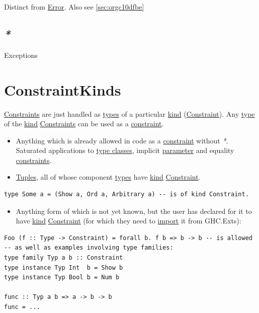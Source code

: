 \documentclass[a4paper,14pt,oneside]{book}
\begin{document}
Distinct from \hyperref[orgd80e896]{Error}. Also see \ref{sec:orgc10dfbe}

\section{\emph{*}}
\label{sec:org4d16655}

\label{orgca1b952}Exceptions

\chapter{\label{orgb2b7e99}ConstraintKinds}
\label{sec:org1b0f895}
\hyperref[orgf08caf5]{Constraints} are just handled as \hyperref[orga4bf41f]{types} of a particular \hyperref[orgde9e925]{kind} (\hyperref[org2db4021]{Constraint}).
Any \hyperref[org9ebb16e]{type} of the \hyperref[orgde9e925]{kind} \hyperref[orgf08caf5]{Constraints} can be used as a \hyperref[org2db4021]{constraint}.
\begin{itemize}
\item Anything which is already allowed in code as a \hyperref[org2db4021]{constraint} without \emph{*}. Saturated applications to \hyperref[orga615306]{type classes}, implicit \hyperref[org65ec757]{parameter} and equality \hyperref[orgf08caf5]{constraints}.
\item \hyperref[orga640dd8]{Tuples}, all of whose component \hyperref[orga4bf41f]{types} have \hyperref[orgde9e925]{kind} \hyperref[org2db4021]{Constraint}.
\end{itemize}
\begin{verbatim}
type Some a = (Show a, Ord a, Arbitrary a) -- is of kind Constraint.
\end{verbatim}
\begin{itemize}
\item Anything form of which is not yet known, but the user has declared for it to have \hyperref[orgde9e925]{kind} \hyperref[org2db4021]{Constraint} (for which they need to \hyperref[orgb8451cd]{import} it from GHC.Exts):
\end{itemize}
\begin{verbatim}
Foo (f :: Type -> Constraint) = forall b. f b => b -> b -- is allowed
-- as well as examples involving type families:
type family Typ a b :: Constraint
type instance Typ Int  b = Show b
type instance Typ Bool b = Num b

func :: Typ a b => a -> b -> b
func = ...
\end{verbatim}
\end{document}
